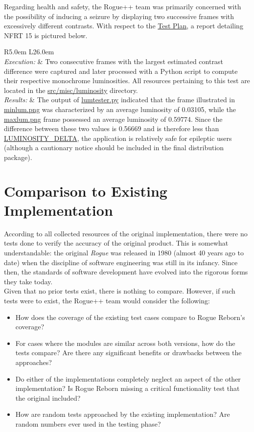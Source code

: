 \documentclass[12pt, titlepage]{article}
\newcommand{\newsection}[1]{\newpage\section{#1}}
\newcommand{\nfrtc}[3]{
	\begin{table}[H]
		\centering
		\def\arraystretch{1.6}
		\begin{tabular}{ R{5.0em} L{26.0em} }
			\bottomrule
			\multicolumn{2}{ c }{\textbf{Non-Functional Requirement Test} \# #1 \textbf{Report}}  \\
			\hline
			\textit{Execution:} & #2 \\
			\textit{Results:} & #3 \\
			\toprule
		\end{tabular}
	\end{table}
}
\newcommand{\tplink}[1]{\href{run:../TestPlan/TestPlan.pdf}{#1}}
\begin{document}
		Regarding health and safety, the Rogue++ team was primarily concerned with the possibility of inducing a seizure by displaying two successive frames with excessively different contrasts.  With respect to the \href{run:../TestPlan/TestPlan.pdf}{Test Plan}, a report detailing NFRT 15 is pictured below.

	\nfrtc {15}
			{Two consecutive frames with the largest estimated contrast difference were captured and later processed with a Python script to compute their respective monochrome luminosities.  All resources pertaining to this test are located in the \href{run:../../src/misc/luminosity}{src/misc/luminosity} directory.}
			{The output of \href{run:../../src/misc/luminosity/lumtester.py}{lumtester.py} indicated that the frame illustrated in \href{run:../../src/misc/luminosity/minlum.png}{minlum.png} was characterized by an average luminosity of 0.03105, while the \href{run:../../src/misc/luminosity/maxlum.png}{maxlum.png} frame possessed an average luminosity of 0.59774.  Since the difference between these two values is 0.56669 and is therefore less than \tplink{LUMINOSITY\_DELTA}, the application is relatively safe for epileptic users (although a cautionary notice should be included in the final distribution package).}

\newsection{Comparison to Existing Implementation} \label{Section_Comparison}

	According to all collected resources of the original implementation, there were no tests done to verify the accuracy of the original product. This is somewhat understandable: the original \textit{Rogue} was released in 1980 (almost 40 years ago to date) when the discipline of software engineering was still in its infancy.  Since then, the standards of software development have evolved into the rigorous forms they take today.\\

	Given that no prior tests exist, there is nothing to compare.  However, if such tests were to exist, the Rogue++ team would consider the following:
	\begin{itemize}
		\item How does the coverage of the existing test cases compare to Rogue Reborn's coverage?
		\item For cases where the modules are similar across both versions, how do the tests compare?  Are there any significant benefits or drawbacks between the approaches?
		\item Do either of the implementations completely neglect an aspect of the other implementation?  Is Rogue Reborn missing a critical functionality test that the original included?
		\item How are random tests approached by the existing implementation?  Are random numbers ever used in the testing phase?
	\end{itemize}
\end{document}
